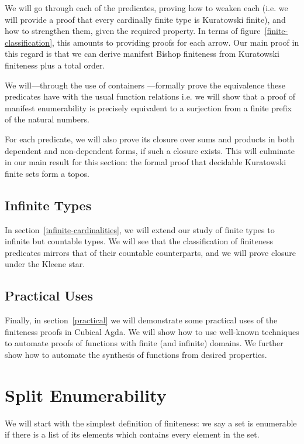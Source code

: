 

We will go through each of the predicates, proving how to weaken each (i.e. we
will provide a proof that every cardinally finite type is Kuratowski finite),
and how to strengthen them, given the required property.
In terms of figure~\ref{finite-classification}, this amounts to providing proofs
for each arrow.
Our main proof in this regard is that we can derive manifest Bishop finiteness
from Kuratowski finiteness plus a total order.

We will---through the use of containers
\cite{abbottContainersConstructingStrictly2005}---formally prove the equivalence
these predicates have with the usual function relations i.e. we will show that a
proof of manifest enumerability is precisely equivalent to a surjection from a
finite prefix of the natural numbers.

For each predicate, we will also prove its closure over sums and products in
both dependent and non-dependent forms, if such a closure exists.
This will culminate in our main result for this section: the formal proof that
decidable Kuratowski finite sets form a topos.
\subsection{Infinite Types}
In section~\ref{infinite-cardinalities}, we will extend our study of finite
types to infinite but countable types.
We will see that the classification of finiteness predicates mirrors that of
their countable counterparts, and we will prove closure under the Kleene star.

\subsection{Practical Uses}
Finally, in section~\ref{practical} we will demonstrate some practical uses of
the finiteness proofs in Cubical Agda.
We will show how to use well-known techniques
\cite{firsovDependentlyTypedProgramming2015, devrieseBrightSideType2011} to
automate proofs of functions with finite (and infinite) domains.
We further show how to automate the synthesis of functions from desired
properties.
\section{Split Enumerability} \label{split-enumerable}
We will start with the simplest definition of finiteness: we say a set is
enumerable if there is a list of its elements which contains every element in
the set.

